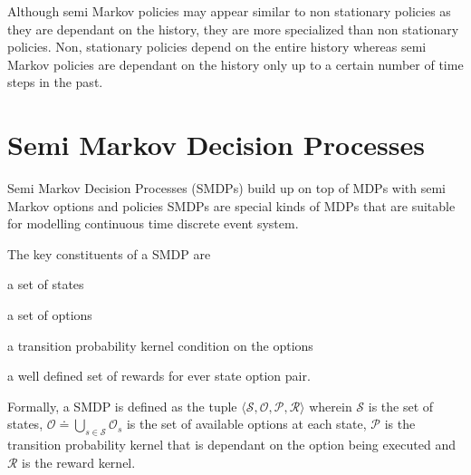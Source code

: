 Although semi Markov policies may appear similar to non stationary policies as they are dependant on the history, they are more specialized than non stationary policies.
Non, stationary policies depend on the entire history whereas semi Markov policies are dependant on the history only up to a certain number of time steps in the past.


\section{Semi Markov Decision Processes}


Semi Markov Decision Processes (SMDPs) build up on top of MDPs with semi Markov options and policies
SMDPs are special kinds of MDPs that are suitable for modelling continuous time discrete event system.

The key constituents of a SMDP are
\begin{inparaenum}[(a)]
    \item a set of states
    \item a set of options
    \item a transition probability kernel condition on the options
    \item a well defined set of rewards for ever state option pair.
\end{inparaenum}

Formally, a SMDP is defined as the tuple $\langle \mathcal{S}, \mathcal{O}, \mathcal{P}, \mathcal{R} \rangle$ wherein $\mathcal{S}$ is the set of states, $\mathcal{O} \doteq \bigcup_{s \in \mathcal{S}} \mathcal{O}_s$ is the set of available options at each state, $\mathcal{P}$ is the transition probability kernel that is dependant on the option being executed and $\mathcal{R}$ is the reward kernel.